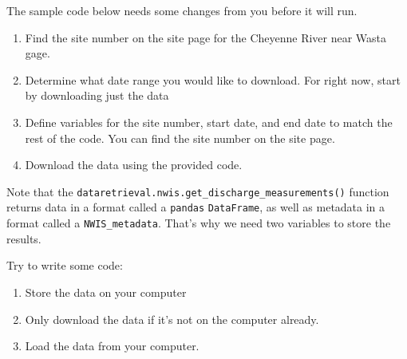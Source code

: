\documentclass[
  letterpaper,
  DIV=11,
  numbers=noendperiod,
  oneside]{scrreprt}
\providecommand{\tightlist}{%
  \setlength{\itemsep}{0pt}\setlength{\parskip}{0pt}}
\begin{document}
\begin{tcolorbox}[enhanced jigsaw, colbacktitle=quarto-callout-color!10!white, opacityback=0, bottomtitle=1mm, toptitle=1mm, bottomrule=.15mm, left=2mm, colframe=quarto-callout-color-frame, leftrule=.75mm, opacitybacktitle=0.6, colback=white, rightrule=.15mm, toprule=.15mm, breakable, titlerule=0mm, title=\textcolor{quarto-callout-color}{\faInfo}\hspace{0.5em}{Try It}, coltitle=black, arc=.35mm]

The sample code below needs some changes from you before it will run.

\begin{enumerate}
\def\labelenumi{\arabic{enumi}.}
\tightlist
\item
  Find the site number on the site page for the Cheyenne River near
  Wasta gage.
\item
  Determine what date range you would like to download. For right now,
  start by downloading just the data
\item
  Define variables for the site number, start date, and end date to
  match the rest of the code. You can find the site number on the site
  page.
\item
  Download the data using the provided code.
\end{enumerate}

Note that the \texttt{dataretrieval.nwis.get\_discharge\_measurements()}
function returns data in a format called a \texttt{pandas}
\texttt{DataFrame}, as well as metadata in a format called a
\texttt{NWIS\_metadata}. That's why we need two variables to store the
results.

\end{tcolorbox}

\begin{tcolorbox}[enhanced jigsaw, colbacktitle=quarto-callout-color!10!white, opacityback=0, bottomtitle=1mm, toptitle=1mm, bottomrule=.15mm, left=2mm, colframe=quarto-callout-color-frame, leftrule=.75mm, opacitybacktitle=0.6, colback=white, rightrule=.15mm, toprule=.15mm, breakable, titlerule=0mm, title=\textcolor{quarto-callout-color}{\faInfo}\hspace{0.5em}{Looking for an Extra Challenge?}, coltitle=black, arc=.35mm]

Try to write some code:

\begin{enumerate}
\def\labelenumi{\arabic{enumi}.}
\tightlist
\item
  Store the data on your computer
\item
  Only download the data if it's not on the computer already.
\item
  Load the data from your computer.
\end{enumerate}

\end{tcolorbox}
\end{document}
